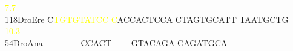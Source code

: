 \documentclass[11pt,twoside,reqno,a4paper]{article}
\begin{document}
{\hspace*{4\charwidth}\hspace*{7\charwidth}\hspace*{1\charwidth}\textcolor{Yellow}{7.7}\hspace*{1\charwidth}\hspace*{1\charwidth}\hspace*{1\charwidth}\\
118\hspace*{1\charwidth}DroEre	C\textcolor{Yellow}{T}\textcolor{Yellow}{G}\textcolor{Yellow}{T}\textcolor{Yellow}{G}\textcolor{Yellow}{T}\textcolor{Yellow}{A}\textcolor{Yellow}{T}\textcolor{Yellow}{C}\textcolor{Yellow}{C}	\textcolor{Yellow}{C}ACCACTCCA	CTAGTGCATT	TAATGCTG\\
\hspace*{4\charwidth}\hspace*{7\charwidth}\hspace*{1\charwidth}\textcolor{Yellow}{10.3}\hspace*{1\charwidth}\hspace*{1\charwidth}\hspace*{1\charwidth}\\
54\hspace*{2\charwidth}DroAna	----------	--CCACT---	---GTACAGA	CAGATGCA\\
\hspace*{4\charwidth}\hspace*{7\charwidth}\hspace*{1\charwidth}\hspace*{1\charwidth}\hspace*{1\charwidth}\\
\\
}
\end{document}

